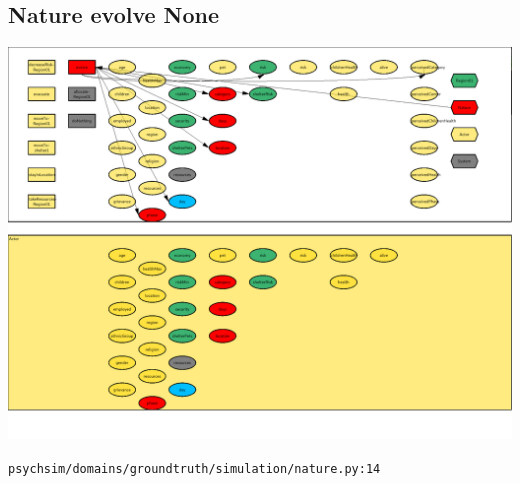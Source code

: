 \documentclass{article}%
\begin{document}
\subsection{Nature evolve None}%
\label{subsec:Nature evolve None}%
\includegraphics[width=\textwidth]{images/Nature-evolve.png}%
\begin{flushleft}%
\verb|psychsim/domains/groundtruth/simulation/nature.py:14|%
\end{flushleft}%
\end{document}
